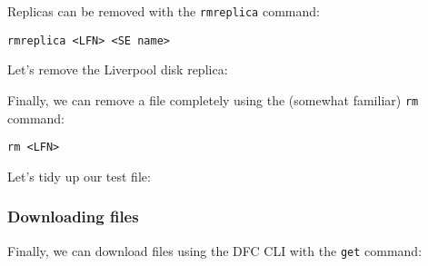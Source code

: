 \begin{Shaded}
\begin{Highlighting}[]
\KeywordTok{>}
\end{Highlighting}
\end{Shaded}

Replicas can be removed with the \texttt{rmreplica} command:

\begin{verbatim}
rmreplica <LFN> <SE name>
\end{verbatim}

Let's remove the Liverpool disk replica:

\begin{Shaded}
\begin{Highlighting}[]
\KeywordTok{>}
 
\end{Highlighting}
\end{Shaded}

Finally, we can remove a file completely using the (somewhat familiar)
\texttt{rm} command:

\begin{verbatim}
rm <LFN>
\end{verbatim}

Let's tidy up our test file:

\begin{Shaded}
\begin{Highlighting}[]
\KeywordTok{>}
 
\end{Highlighting}
\end{Shaded}

\subsubsection{Downloading files}
\label{downloading-files}
Finally, we can download files using the DFC CLI with the \texttt{get}
command:

